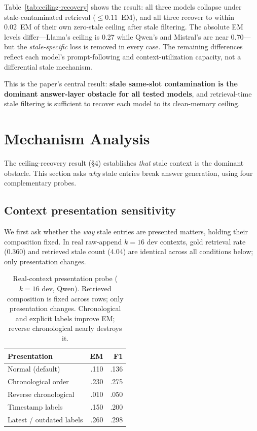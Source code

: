 \documentclass[11pt,twocolumn]{article}
\begin{document}
Table~\ref{tab:ceiling-recovery} shows the result: all three models collapse under stale-contaminated retrieval (\({\leq}0.11\)~EM), and all three recover to within 0.02~EM of their own zero-stale ceiling after stale filtering.
The absolute EM levels differ---Llama's ceiling is 0.27 while Qwen's and Mistral's are near 0.70---but the \emph{stale-specific} loss is removed in every case.
The remaining differences reflect each model's prompt-following and context-utilization capacity, not a differential stale mechanism.

This is the paper's central result: \textbf{stale same-slot contamination is the dominant answer-layer obstacle for all tested models}, and retrieval-time stale filtering is sufficient to recover each model to its clean-memory ceiling.

\section{Mechanism Analysis}

The ceiling-recovery result (\S4) establishes \emph{that} stale context is the dominant obstacle.
This section asks \emph{why} stale entries break answer generation, using four complementary probes.

\subsection{Context presentation sensitivity}
\label{sec:context-presentation}

We first ask whether the \emph{way} stale entries are presented matters, holding their composition fixed.
In real raw-append \(k{=}16\) dev contexts, gold retrieval rate (0.360) and retrieved stale count (4.04) are identical across all conditions below; only presentation changes.

\begin{table}[t]
\centering
\small
\begin{tabular}{lrr}
\toprule
Presentation & EM & F1 \\
\midrule
Normal (default) & .110 & .136 \\
Chronological order & .230 & .275 \\
Reverse chronological & .010 & .050 \\
Timestamp labels & .150 & .200 \\
Latest / outdated labels & .260 & .298 \\
\bottomrule
\end{tabular}
\caption{Real-context presentation probe (\(k{=}16\) dev, Qwen). Retrieved composition is fixed across rows; only presentation changes. Chronological and explicit labels improve EM; reverse chronological nearly destroys it.}
\label{tab:real-context-mechanism}
\end{table}
\end{document}
